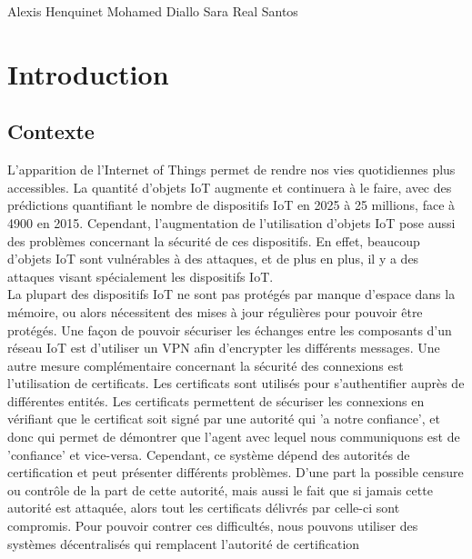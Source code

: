 \documentclass[12pt, openany]{report}
\begin{document}
\begin{titlepage}
\begin{sffamily}
\begin{center}
   \vfill
      \begin{center}
        \Large	 Alexis Henquinet \hspace*{1cm} Mohamed Diallo \hspace*{1cm} Sara Real Santos
      \end{center}
 
 
  \end{center}
  \end{sffamily}
\end{titlepage}

\newpage

\renewcommand{\contentsname}{Sommaire}
\tableofcontents
\newpage

\section{Introduction}
\subsection{Contexte}
\noindent 
\begin{flushleft}
L'apparition de l'Internet of Things permet de rendre nos vies quotidiennes plus accessibles. La quantité d'objets IoT augmente et continuera à le faire, avec des prédictions quantifiant le nombre de dispositifs IoT en 2025 à 25 millions, face à 4900 en 2015. Cependant, l'augmentation de l'utilisation d'objets IoT pose aussi des problèmes concernant la sécurité de ces dispositifs. En effet, beaucoup d'objets IoT sont vulnérables à des attaques, et de plus en plus, il y a des attaques visant spécialement les dispositifs IoT.\\ 
\vspace{5mm}
La plupart des dispositifs IoT ne sont pas protégés par manque d'espace dans la mémoire, ou alors nécessitent des mises à jour régulières pour pouvoir être protégés. Une façon de pouvoir sécuriser les échanges entre les composants d'un réseau IoT est d'utiliser un VPN afin d'encrypter les différents messages. Une autre mesure complémentaire concernant la sécurité des connexions est l'utilisation de certificats. Les certificats sont utilisés pour s'authentifier auprès de différentes entités. Les certificats permettent de sécuriser les connexions en vérifiant que le certificat soit signé par une autorité qui 'a notre confiance', et donc qui permet de démontrer que l'agent avec lequel nous communiquons est de 'confiance' et vice-versa. Cependant, ce système dépend des autorités de certification et peut présenter différents problèmes. D'une part la possible censure ou contrôle de la part de cette autorité, mais aussi le fait que si jamais cette autorité est attaquée, alors tout les certificats délivrés par celle-ci sont compromis. Pour pouvoir contrer ces difficultés, nous pouvons utiliser des systèmes décentralisés qui remplacent l'autorité de certification\\
\end{flushleft}
\end{document}
